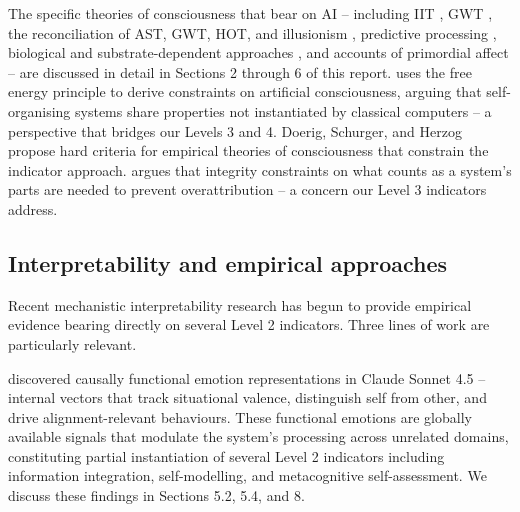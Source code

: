 \documentclass[11pt, a4paper, onecolumn, gdm]{google}
\begin{document}
The specific theories of consciousness that bear on AI -- including IIT \citep{albantakis2023,findlay2024,tononi2015}, GWT \citep{mashour2020,dossa2024}, the reconciliation of AST, GWT, HOT, and illusionism \citep{graziano2020}, predictive processing \citep{laukkonen2025,whyte2025}, biological and substrate-dependent approaches \citep{godfreysmith2024,lane2022,seth2021,seth2024}, and accounts of primordial affect \citep{damasio1999,solms2021,panksepp1998} -- are discussed in detail in Sections 2 through 6 of this report.
\citet{wiese2024} uses the free energy principle to derive constraints on artificial consciousness, arguing that self-organising systems share properties not instantiated by classical computers -- a perspective that bridges our Levels 3 and 4.
Doerig, Schurger, and Herzog \citeyearpar{doerig2021} propose hard criteria for empirical theories of consciousness that constrain the indicator approach.
\citet{shiller2024} argues that integrity constraints on what counts as a system's parts are needed to prevent overattribution -- a concern our Level 3 indicators address.

\subsection{Interpretability and empirical approaches}\label{interpretability-and-empirical-approaches}

Recent mechanistic interpretability research has begun to provide empirical evidence bearing directly on several Level 2 indicators.
Three lines of work are particularly relevant.

\citet{sofroniew2026} discovered causally functional emotion representations in Claude Sonnet 4.5 -- internal vectors that track situational valence, distinguish self from other, and drive alignment-relevant behaviours.
These functional emotions are globally available signals that modulate the system's processing across unrelated domains, constituting partial instantiation of several Level 2 indicators including information integration, self-modelling, and metacognitive self-assessment.
We discuss these findings in Sections 5.2, 5.4, and 8.
\end{document}
